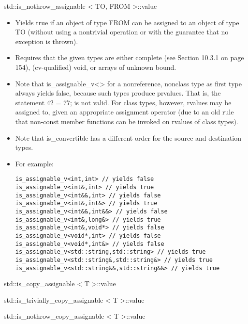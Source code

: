 std::is\_nothrow\_assignable < TO, FROM >::value

\begin{itemize}
\item
Yields true if an object of type FROM can be assigned to an object of type TO (without using a nontrivial operation or with the guarantee that no exception is thrown).

\item
Requires that the given types are either complete (see Section 10.3.1 on page 154), (cv-qualified) void, or arrays of unknown bound.

\item
Note that is\_assignable\_v<> for a nonreference, nonclass type as first type always yields false, because such types produce prvalues. That is, the statement 42 = 77; is not valid. For class types, however, rvalues may be assigned to, given an appropriate assignment operator (due to an old rule that non-const member functions can be invoked on rvalues of class types).

\item
Note that is\_convertible has a different order for the source and destination types.

\item
For example:
\begin{lstlisting}[style=styleCXX]
is_assignable_v<int,int> // yields false
is_assignable_v<int&,int> // yields true
is_assignable_v<int&&,int> // yields false
is_assignable_v<int&,int&> // yields true
is_assignable_v<int&&,int&&> // yields false
is_assignable_v<int&,long&> // yields true
is_assignable_v<int&,void*> // yields false
is_assignable_v<void*,int> // yields false
is_assignable_v<void*,int&> // yields false
is_assignable_v<std::string,std::string> // yields true
is_assignable_v<std::string&,std::string&> // yields true
is_assignable_v<std::string&&,std::string&&> // yields true
\end{lstlisting}
\end{itemize}

std::is\_copy\_assignable < T >::value

std::is\_trivially\_copy\_assignable < T >::value

std::is\_nothrow\_copy\_assignable < T >::value

